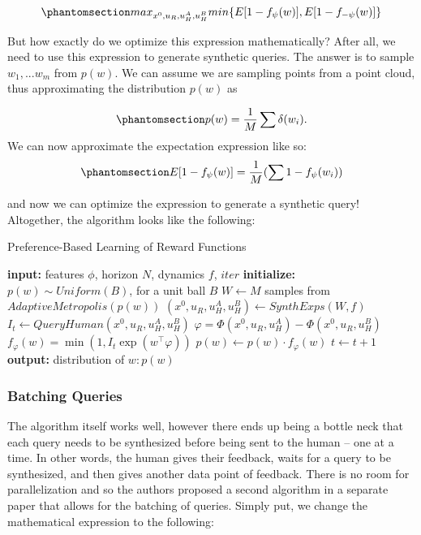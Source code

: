 \documentclass[
  letterpaper,
  numbers=noenddot,
  DIV=11]{scrreprt}
\theoremstyle{definition}
\theoremstyle{plain}
\theoremstyle{plain}
\theoremstyle{remark}
\begin{document}
\begin{equation}\phantomsection\label{eq-eq3.41}{max_{x^0, u_R, u_H^A, u_H^B} min\{E[1-f_{\psi}(w)], E[1 - f_{-\psi}(w)]\}}\end{equation}

But how exactly do we optimize this expression mathematically? After
all, we need to use this expression to generate synthetic queries. The
answer is to sample \(w_1, ... w_m\) from \(p(w)\). We can assume we are
sampling points from a point cloud, thus approximating the distribution
\(p(w)\) as

\begin{equation}\phantomsection\label{eq-eq3.42}{p(w) = \frac{1}{M} \sum \delta (w_i).}\end{equation}
We can now approximate the expectation expression like so:
\begin{equation}\phantomsection\label{eq-eq3.43}{E[1 - f_{\psi}(w)] = \frac{1}{M} (\sum 1 - f_{\psi}(w_i))}\end{equation}

and now we can optimize the expression to generate a synthetic query!
Altogether, the algorithm looks like the following:

\begin{algorithm}[H]
\caption{Preference-Based Learning of Reward Functions}
\label{alg-design}
\begin{algorithmic}[1]
    \State \textbf{input:} features $\phi$, horizon $N$, dynamics $f$, $iter$
    \State \textbf{initialize:} $p(w) \sim Uniform(B)$, for a unit ball $B$
        \State $W \gets M$ samples from $AdaptiveMetropolis(p(w))$
        \State $(x^0, u_R, u^A_H, u^B_H) \gets SynthExps(W,f)$
        \State $I_t \gets QueryHuman(x^0, u_R, u^A_H, u^B_H)$
        \State $\varphi = \Phi(x^0, u_R, u^A_H) - \Phi(x^0, u_R, u^B_H)$
        \State $f_\varphi(w) = \min(1, I_t\exp(w^\top \varphi))$
        \State $p(w) \gets p(w) \cdot f_\varphi(w)$
        \State $t \gets t+1$
    \EndWhile
    \State \textbf{output:} distribution of $w: p(w)$
\end{algorithmic}
\end{algorithm}

\subsubsection*{Batching Queries}\label{batching-queries}

The algorithm itself works well, however there ends up being a bottle
neck that each query needs to be synthesized before being sent to the
human -- one at a time. In other words, the human gives their feedback,
waits for a query to be synthesized, and then gives another data point
of feedback. There is no room for parallelization and so the authors
proposed a second algorithm in a separate paper that allows for the
batching of queries. Simply put, we change the mathematical expression
to the following:
\end{document}
